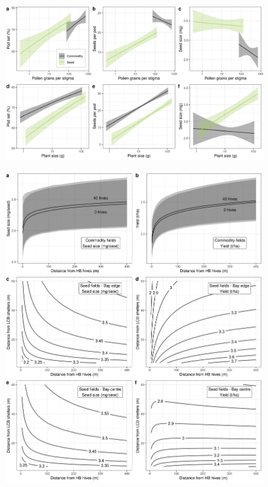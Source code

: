 \documentclass[12pt]{article} %
\begin{document}
\begin{figure}
    \centering
    \includegraphics[width=\textwidth,keepaspectratio=true]{allSeeds.png}
\end{figure}

\begin{figure}
    \centering
    \includegraphics[width=\textwidth,keepaspectratio=true]{allYield.png}
    \label{fig:allYield}
\end{figure}
\end{document}
